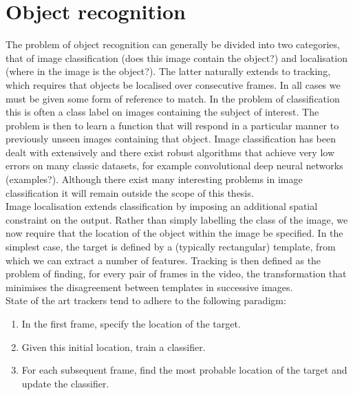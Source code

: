 \chapter{Object recognition}
\label{objrecognition}


The problem of object recognition can generally be divided into two categories, that of image classification (does this image contain the object?) and localisation (where in the image is the object?). The latter naturally extends to tracking, which requires that objects be localised over consecutive frames. In all cases we must be given some form of reference to match. In the problem of classification this is often a class label on images containing the subject of interest. The problem is then to learn a function that will respond in a particular manner to previously unseen images containing that object. Image classification has been dealt with extensively and there exist robust algorithms that achieve very low errors on many classic datasets, for example convolutional deep neural networks (examples?). Although there exist many interesting problems in image classification it will remain outside the scope of this thesis. \\

Image localisation extends classification by imposing an additional spatial constraint on the output. Rather than simply labelling the class of the image, we now require that the location of the object within the image be specified. In the simplest case, the target is defined by a (typically rectangular) template, from which we can extract a number of features. Tracking is then defined as the problem of finding, for every pair of frames in the video, the transformation that minimises the disagreement between templates in successive images.  \\

\noindent State of the art trackers tend to adhere to the following paradigm:
  
\begin{enumerate}
\item{In the first frame, specify the location of the target.}
\item{Given this initial location, train a classifier.}
\item{For each subsequent frame, find the most probable location of the target and update the classifier.}
\end{enumerate}

